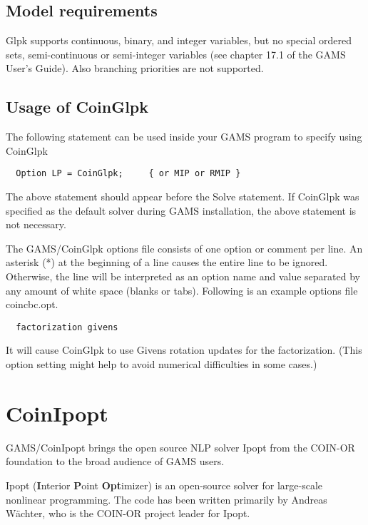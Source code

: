 \subsection{Model requirements}

Glpk supports continuous, binary, and integer variables, but no special ordered sets, semi-continuous or semi-integer variables (see chapter 17.1 of the GAMS User's Guide).
Also branching priorities are not supported.

\subsection{Usage of CoinGlpk}

The following statement can be used inside your GAMS program to specify using CoinGlpk
\begin{verbatim}
  Option LP = CoinGlpk;     { or MIP or RMIP }
\end{verbatim}

The above statement should appear before the Solve statement.
If CoinGlpk was specified as the default solver during GAMS installation, the above statement is not necessary.

The GAMS/CoinGlpk options file consists of one option or comment per line.
An asterisk (*) at the beginning of a line causes the entire line to be ignored.
Otherwise, the line will be interpreted as an option name and value separated by any amount of white space (blanks or tabs).
Following is an example options file coincbc.opt.
\begin{verbatim}
  factorization givens
\end{verbatim}
It will cause CoinGlpk to use Givens rotation updates for the factorization. (This option setting might help to avoid numerical difficulties in some cases.)






\section{CoinIpopt}

GAMS/CoinIpopt brings the open source NLP solver Ipopt from the COIN-OR foundation to the broad audience of GAMS users.

Ipopt (\textbf{I}nterior \textbf{P}oint \textbf{Opt}imizer) is an open-source solver for large-scale nonlinear programming.
The code has been written primarily by Andreas W\"achter, who is the COIN-OR project leader for Ipopt.

